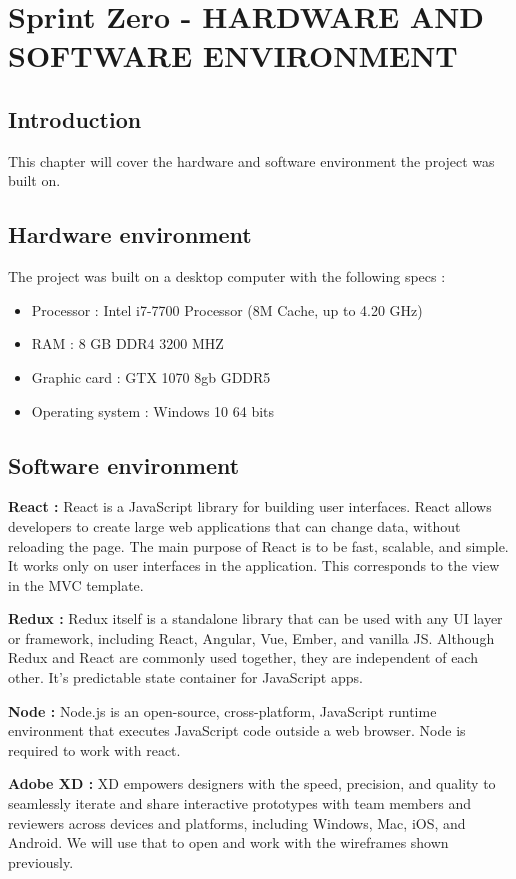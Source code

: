 \chapter{Sprint Zero - HARDWARE AND SOFTWARE ENVIRONMENT}
\newpage
\section*{Introduction}
This chapter will cover the hardware and software environment the project was built on.
\section{Hardware environment}
The project was built on a desktop computer with the following specs :

\begin{itemize}
  \item Processor : Intel i7-7700 Processor (8M Cache, up to 4.20 GHz)
  \item RAM : 8 GB DDR4 3200 MHZ
  \item Graphic card : GTX  1070 8gb GDDR5
  \item Operating system : Windows 10 64 bits
\end{itemize}
\section{Software environment}

\hfill \break
\textbf{React \cite{cite3} :} React is a JavaScript library for building user interfaces. React allows developers to create large web applications that can change data, without reloading the page. The main purpose of React is to be fast, scalable, and simple. It works only on user interfaces in the application. This corresponds to the view in the MVC template.


\textbf{Redux \cite{cite4} :} Redux itself is a standalone library that can be used with any UI layer or framework, including React, Angular, Vue, Ember, and vanilla JS. Although Redux and React are commonly used together, they are independent of each other. It's predictable state container for JavaScript apps.

\hfill \break
\hfill \break
\textbf{Node \cite{cite2} :} Node.js is an open-source, cross-platform, JavaScript runtime environment that executes JavaScript code outside a web browser. Node is required to work with react.

\hfill \break
\hfill \break
\textbf{Adobe XD \cite{cite9} :} XD empowers designers with the speed, precision, and quality to seamlessly iterate and share interactive prototypes with team members and reviewers across devices and platforms, including Windows, Mac, iOS, and Android. We will use that to open and work with the wireframes shown previously.

